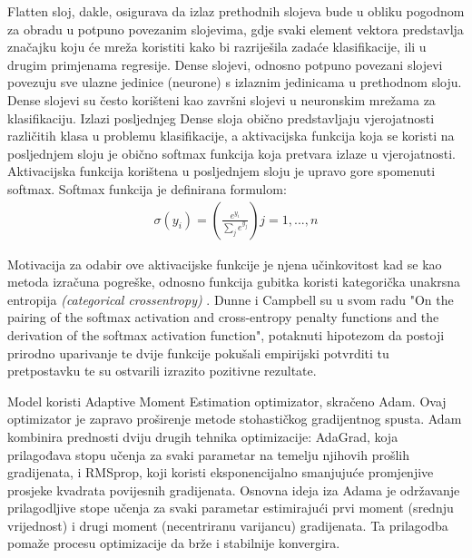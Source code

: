 \documentclass[times, utf8, zavrsni]{fer}
\begin{document}
Flatten sloj, dakle, osigurava da izlaz prethodnih slojeva bude u obliku pogodnom za obradu u potpuno povezanim slojevima, gdje svaki element vektora predstavlja značajku koju će mreža koristiti kako bi razriješila zadaće klasifikacije, ili u drugim primjenama regresije.
Dense slojevi, odnosno potpuno povezani slojevi povezuju sve ulazne jedinice (neurone) s izlaznim jedinicama u prethodnom sloju.
Dense slojevi su često korišteni kao završni slojevi u neuronskim mrežama za klasifikaciju. Izlazi posljednjeg Dense sloja obično predstavljaju vjerojatnosti različitih klasa u problemu klasifikacije, a aktivacijska funkcija koja se koristi na posljednjem sloju je obično softmax funkcija koja pretvara izlaze u vjerojatnosti.
\pagebreak
Aktivacijska funkcija korištena u posljednjem sloju je upravo gore spomenuti softmax.
Softmax funkcija je definirana formulom: 
\begin{eqnarray}
\sigma(y_{i}) = \left(\frac{e^{y_{i}}}{ \sum\limits_{j} e^{y_{j}}}\right)
j = 1,...,n
\end{eqnarray}

Motivacija za odabir ove aktivacijske funkcije je njena učinkovitost kad se kao metoda izračuna pogreške, odnosno funkcija gubitka koristi kategorička unakrsna entropija \emph{(categorical crossentropy)} \citep{dunne1997pairing}.
Dunne i Campbell su u svom radu "On the pairing of the softmax activation and cross-entropy penalty functions and the derivation of the softmax activation function", potaknuti hipotezom da postoji prirodno uparivanje te dvije funkcije pokušali empirijski potvrditi tu pretpostavku te su ostvarili izrazito pozitivne rezultate. 

Model koristi Adaptive Moment Estimation optimizator, skračeno Adam. Ovaj optimizator je zapravo proširenje metode stohastičkog gradijentnog spusta.
Adam kombinira prednosti dviju drugih tehnika optimizacije: AdaGrad, koja prilagođava stopu učenja za svaki parametar na temelju njihovih prošlih gradijenata, i RMSprop, koji koristi eksponencijalno smanjujuće promjenjive prosjeke kvadrata povijesnih gradijenata.
Osnovna ideja iza Adama je održavanje prilagodljive stope učenja za svaki parametar estimirajući prvi moment (srednju vrijednost) i drugi moment (necentriranu varijancu) gradijenata. Ta prilagodba pomaže procesu optimizacije da brže i stabilnije konvergira.\citep{kingma2014adam}
\end{document}
